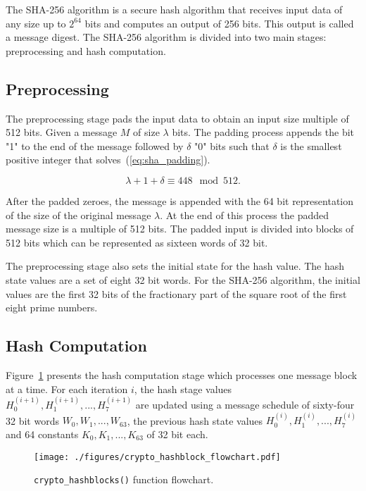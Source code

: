 The SHA-256 algorithm \cite{SHA_NIST_FIPS} is a secure hash algorithm that
receives input data of any size up to $2^{64}$ bits and computes an output of
256 bits. This output is called a message digest.
The SHA-256 algorithm is divided into two main stages: preprocessing and hash
computation.

\subsection{Preprocessing}
\label{subsec:preprocessing}
The preprocessing stage pads the input data to obtain an input size multiple of
512 bits. Given a message $M$ of size $\lambda$ bits. The padding process
appends the bit "1" to the end of the message followed by $\delta$ "0" bits
such that $\delta$ is the smallest positive integer that
solves~(\ref{eq:sha_padding}).

\begin{equation}
\lambda + 1 + \delta \equiv 448 \mod 512.
\label{eq:sha_padding}
\end{equation}

After the padded zeroes, the message is appended with the 64 bit representation
of the size of the original message $\lambda$. At the end of this process the 
padded message size is a multiple of 512 bits. The padded input is divided into
blocks of 512 bits which can be represented as sixteen words of 32 bit. 

The preprocessing stage also sets the initial state for the hash value. The hash
state values are a set of eight 32 bit words. For the SHA-256 algorithm, the
initial values are the first 32 bits of the fractionary part of the square root
of the first eight prime numbers.

\subsection{Hash Computation}
\label{subsec:hash_computation}

Figure~\ref{fig:hash_flowchart} presents the hash computation stage which
processes one message block at a time. For each iteration $i$, the hash stage
values $H_{0}^{(i+1)}, H_{1}^{(i+1)},..., H_{7}^{(i+1)}$ are updated using a
message schedule of sixty-four 32 bit words $W_0, W_1,..., W_{63}$, the previous hash
state values $H_{0}^{(i)}, H_{1}^{(i)},..., H_{7}^{(i)}$ and 64 constants 
$K_{0},K_{1},...,K_{63}$ of 32 bit each.

\begin{figure}[!htbp]
    \centerline{\texttt{[image: ./figures/crypto\_hashblock\_flowchart.pdf]}}
    \vspace{0cm}\caption{\texttt{crypto\_hashblocks()} function flowchart.}
    \label{fig:hash_flowchart}
\end{figure}

